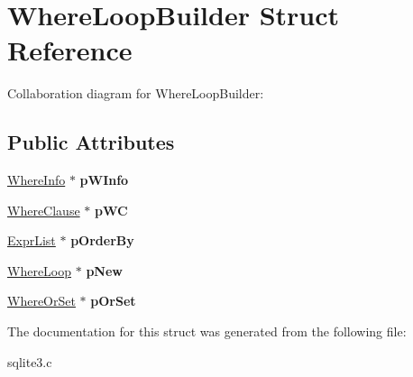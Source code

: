 \hypertarget{structWhereLoopBuilder}{}\section{Where\+Loop\+Builder Struct Reference}
\label{structWhereLoopBuilder}


Collaboration diagram for Where\+Loop\+Builder\+:
\subsection*{Public Attributes}
\begin{DoxyCompactItemize}
\item 
\hyperlink{structWhereInfo}{Where\+Info} $\ast$ {\bfseries p\+W\+Info}\hypertarget{structWhereLoopBuilder_a45e1ed33ef11ee2c08af6edcda9e5654}{}\label{structWhereLoopBuilder_a45e1ed33ef11ee2c08af6edcda9e5654}

\item 
\hyperlink{structWhereClause}{Where\+Clause} $\ast$ {\bfseries p\+WC}\hypertarget{structWhereLoopBuilder_aff76c3f8b34e4588c587708d59fb6bc9}{}\label{structWhereLoopBuilder_aff76c3f8b34e4588c587708d59fb6bc9}

\item 
\hyperlink{structExprList}{Expr\+List} $\ast$ {\bfseries p\+Order\+By}\hypertarget{structWhereLoopBuilder_a16de740f297add3d4b36905c21554a86}{}\label{structWhereLoopBuilder_a16de740f297add3d4b36905c21554a86}

\item 
\hyperlink{structWhereLoop}{Where\+Loop} $\ast$ {\bfseries p\+New}\hypertarget{structWhereLoopBuilder_ae3ab5ddb99b1d4697f573e9b25442f65}{}\label{structWhereLoopBuilder_ae3ab5ddb99b1d4697f573e9b25442f65}

\item 
\hyperlink{structWhereOrSet}{Where\+Or\+Set} $\ast$ {\bfseries p\+Or\+Set}\hypertarget{structWhereLoopBuilder_adf94dbe3918353f2d9ebfc0bf69d9685}{}\label{structWhereLoopBuilder_adf94dbe3918353f2d9ebfc0bf69d9685}

\end{DoxyCompactItemize}


The documentation for this struct was generated from the following file\+:\begin{DoxyCompactItemize}
\item 
sqlite3.\+c\end{DoxyCompactItemize}
